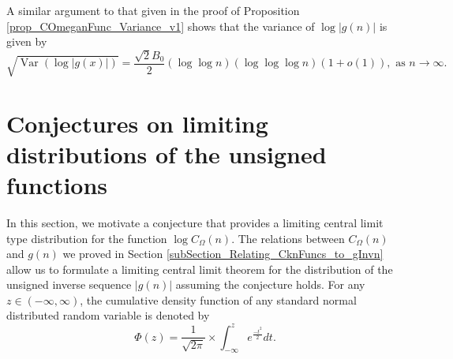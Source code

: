 \documentclass[11pt,reqno,a4letter]{article}
\newcommand{\hlocalref}[1]{\hyperref[#1]{\ref{#1}}}
\numberwithin{equation}{section}
\numberwithin{figure}{section}
\numberwithin{table}{section}
\theoremstyle{plain}
\numberwithin{theorem}{section}
\theoremstyle{definition}
\begin{document}
A similar argument to that given in the proof of 
Proposition \hlocalref{prop_COmeganFunc_Variance_v1} 
shows that the variance of $\log |g(n)|$ is given by 
\[
\sqrt{\operatorname{Var}\left(\log |g(x)|\right)}= 
     \frac{\sqrt{2} B_0}{2} (\log\log n) (\log\log\log n) (1+o(1)), 
     \text{ as } n \rightarrow \infty. 
\]

\section{Conjectures on limiting distributions of the unsigned functions} 
\label{subSection_ErdosKacTheorem_Analogs} 

In this section, we motivate a conjecture that provides a limiting 
central limit type distribution for the function $\log C_{\Omega}(n)$. 
The relations between $C_{\Omega}(n)$ and $g(n)$ we proved in 
Section \hlocalref{subSection_Relating_CknFuncs_to_gInvn} 
allow us to formulate a limiting central limit theorem for the distribution 
of the unsigned inverse sequence $|g(n)|$ assuming  
the conjecture holds. For any $z \in (-\infty, \infty)$, 
the cumulative density function of any standard normal distributed random variable is 
denoted by 
$$\Phi(z) = \frac{1}{\sqrt{2\pi}} \times \int_{-\infty}^{z} e^{\frac{-t^2}{2}} dt.$$ 
\end{document}
